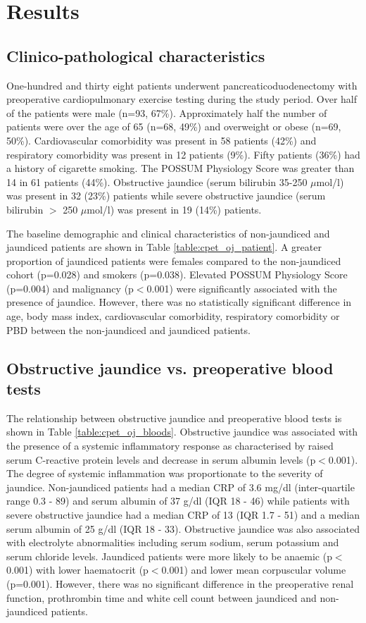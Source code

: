 \clearpage

\section{Results}

\subsection{Clinico-pathological characteristics}
One-hundred and thirty eight patients underwent pancreaticoduodenectomy with preoperative cardiopulmonary exercise testing during the study period. 
Over half of the patients were male (n=93, 67\%). 
Approximately half the number of patients were over the age of 65 (n=68, 49\%) and overweight or obese (n=69, 50\%). 
Cardiovascular comorbidity was present in 58 patients (42\%) and respiratory comorbidity was present in 12 patients (9\%). 
Fifty patients (36\%) had a history of cigarette smoking. 
The POSSUM Physiology Score was greater than 14 in 61 patients (44\%). 
Obstructive jaundice (serum bilirubin 35-250 $\mu$mol/l) was present in 32 (23\%) patients while severe obstructive jaundice (serum bilirubin $>$ 250 $\mu$mol/l) was present in 19 (14\%) patients. 

The baseline demographic and clinical characteristics of non-jaundiced and jaundiced patients are shown in Table \ref{table:cpet_oj_patient}. 
A greater proportion of jaundiced patients were females compared to the non-jaundiced cohort (p=0.028) and smokers (p=0.038). 
Elevated POSSUM Physiology Score (p=0.004) and malignancy (p$<$0.001) were significantly associated with the presence of jaundice. 
However, there was no statistically significant difference in age, body mass index, cardiovascular comorbidity, respiratory comorbidity or PBD between the non-jaundiced and jaundiced patients.



\subsection{Obstructive jaundice vs. preoperative blood tests}
The relationship between obstructive jaundice and preoperative blood tests is shown in Table \ref{table:cpet_oj_bloods}. 
Obstructive jaundice was associated with the presence of a systemic inflammatory response as characterised by raised serum C-reactive protein levels and decrease in serum albumin levels (p$<$0.001). 
The degree of systemic inflammation was proportionate to the severity of jaundice. 
Non-jaundiced patients had a median CRP of 3.6 mg/dl (inter-quartile range 0.3 - 89) and serum albumin of 37 g/dl (IQR 18 - 46) while patients with severe obstructive jaundice had a median CRP of 13 (IQR 1.7 - 51) and a median serum albumin of 25 g/dl (IQR 18 - 33). 
Obstructive jaundice was also associated with electrolyte abnormalities including serum sodium, serum potassium and serum chloride levels. 
Jaundiced patients were more likely to be anaemic (p$<$0.001) with lower haematocrit (p$<$0.001) and lower mean corpuscular volume (p=0.001). 
However, there was no significant difference in the preoperative renal function, prothrombin time and white cell count between jaundiced and non-jaundiced patients. 

